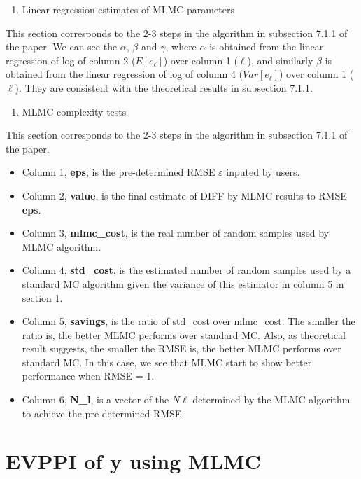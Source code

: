 \documentclass[
]{article}
\providecommand{\tightlist}{%
  \setlength{\itemsep}{0pt}\setlength{\parskip}{0pt}}
\begin{document}
\begin{enumerate}
\def\labelenumi{\arabic{enumi}.}
\setcounter{enumi}{1}
\tightlist
\item
  Linear regression estimates of MLMC parameters
\end{enumerate}

This section corresponds to the 2-3 steps in the algorithm in subsection
7.1.1 of the paper. We can see the \(\alpha\), \(\beta\) and \(\gamma\),
where \(\alpha\) is obtained from the linear regression of log of column
2 (\(E[e_\ell]\)) over column 1 (\(\ell\)), and similarly \(\beta\) is
obtained from the linear regression of log of column 4 (\(Var[e_\ell]\))
over column 1 (\(\ell\)). They are consistent with the theoretical
results in subsection 7.1.1.

\begin{enumerate}
\def\labelenumi{\arabic{enumi}.}
\setcounter{enumi}{2}
\tightlist
\item
  MLMC complexity tests
\end{enumerate}

This section corresponds to the 2-3 steps in the algorithm in subsection
7.1.1 of the paper.

\begin{itemize}
\tightlist
\item
  Column 1, \textbf{eps}, is the pre-determined RMSE \(\varepsilon\)
  inputed by users.
\item
  Column 2, \textbf{value}, is the final estimate of DIFF by MLMC
  results to RMSE \textbf{eps}.
\item
  Column 3, \textbf{mlmc\_cost}, is the real number of random samples
  used by MLMC algorithm.
\item
  Column 4, \textbf{std\_cost}, is the estimated number of random
  samples used by a standard MC algorithm given the variance of this
  estimator in column 5 in section 1.
\item
  Column 5, \textbf{savings}, is the ratio of std\_cost over mlmc\_cost.
  The smaller the ratio is, the better MLMC performs over standard MC.
  Also, as theoretical result suggests, the smaller the RMSE is, the
  better MLMC performs over standard MC. In this case, we see that MLMC
  start to show better performance when RMSE = 1.
\item
  Column 6, \textbf{N\_l}, is a vector of the \(N\ell\) determined by
  the MLMC algorithm to achieve the pre-determined RMSE.
\end{itemize}

\hypertarget{evppi-of-y-using-mlmc}{%
\section{EVPPI of y using MLMC}\label{evppi-of-y-using-mlmc}}
\end{document}
